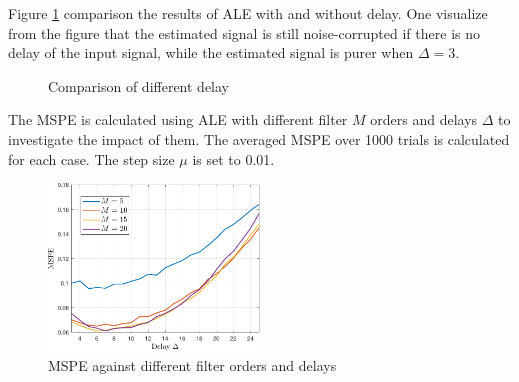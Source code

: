 \documentclass[10pt]{article}
\begin{document}
Figure \ref{fig15_15} comparison the results of ALE with and without delay. 
One visualize from the figure that the estimated signal is still noise-corrupted if there is 
no delay of the input signal, while the estimated signal is purer when 
$\Delta=3$.

\begin{figure}[htbp]
    \centering
    \caption{Comparison of different delay}
    \label{fig15_15}
\end{figure}

The MSPE is calculated using ALE with different filter $M$ orders and delays $\Delta$
to investigate the impact of them. The averaged MSPE over 1000 trials is calculated 
for each case. The step size $\mu$ is set to 0.01.

\begin{figure}[H]
    \centering
	\includegraphics[width=0.5\textwidth]{fig/2.3_6.pdf}
	\caption{MSPE against different filter orders and delays}
    \label{fig16_16}
\end{figure}
\end{document}
